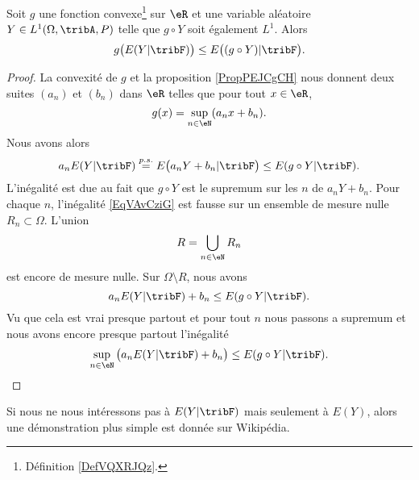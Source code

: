 \begin{proposition}    \label{PropABtKbBo}
    Soit \( g\) une fonction convexe\footnote{Définition \ref{DefVQXRJQz}.} sur \( \eR\) et une variable aléatoire \( Y\in L^1(\Omega,\tribA,P)\) telle que \( g\circ Y\) soit également \( L^1\). Alors
    \begin{equation}
        g\big( E(Y|\tribF) \big)\leq E\big( (g\circ Y)|\tribF \big).
    \end{equation}
\end{proposition}

\begin{proof}
    La convexité de \( g\) et la proposition \ref{PropPEJCgCH} nous donnent deux suites \( (a_n)\) et \( (b_n)\) dans \( \eR\) telles que pour tout \( x\in \eR\),
    \begin{equation}
        g(x)=\sup_{n\in \eN}(a_nx+b_n).
    \end{equation}
    Nous avons alors
    \begin{equation}    \label{EqVAvCziG}
        a_nE(Y|\tribF)\stackrel{p.s.}{=}E\big( a_nY+b_n|\tribF \big)\leq  E(g\circ Y|\tribF).
    \end{equation}
    L'inégalité est due au fait que \( g\circ Y\) est le supremum sur les \( n\) de \( a_nY+b_n\). Pour chaque \( n\), l'inégalité \eqref{EqVAvCziG} est fausse sur un ensemble de mesure nulle \( R_n\subset\Omega\). L'union 
    \begin{equation}
        R=\bigcup_{n\in \eN}R_n
    \end{equation}
    est encore de mesure nulle. Sur \( \Omega\setminus R\), nous avons
    \begin{equation}
        a_nE(Y|\tribF)+b_n\leq E(g\circ Y|\tribF).
    \end{equation}
    Vu que cela est vrai presque partout et pour tout \( n\) nous passons a supremum et nous avons encore presque partout l'inégalité
    \begin{equation}
        \sup_{n\in\eN}\big( a_nE(Y|\tribF)+b_n \big)\leq E(g\circ Y|\tribF).
    \end{equation}
\end{proof}

Si nous ne nous intéressons pas à \( E(Y|\tribF)\) mais seulement à \( E(Y)\), alors une démonstration plus simple est donnée sur Wikipédia\cite{YMmJevi}.
